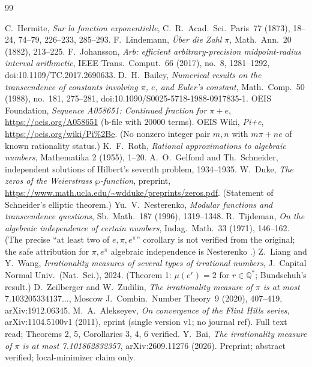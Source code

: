 \documentclass[11pt]{amsart}
\theoremstyle{definition}
\theoremstyle{remark}
\numberwithin{equation}{section}
\newcommand{\Q}{\mathbb{Q}}
\newcommand{\irr}{\mu}
\newcommand{\ee}{e}
\begin{document}
\begin{thebibliography}{99}

 C.~Hermite, \emph{Sur la fonction exponentielle}, C.~R.~Acad.~Sci.~Paris~77 (1873), 18--24, 74--79, 226--233, 285--293.
 F.~Lindemann, \emph{\"Uber die Zahl $\pi$}, Math.~Ann.~20 (1882), 213--225.
 F.~Johansson, \emph{Arb: efficient arbitrary-precision midpoint-radius interval arithmetic}, IEEE Trans.~Comput.~66 (2017), no.~8, 1281--1292, doi:10.1109/TC.2017.2690633.
 D.~H.~Bailey, \emph{Numerical results on the transcendence of constants involving $\pi$, $e$, and Euler's constant}, Math.~Comp.~50 (1988), no.~181, 275--281, doi:10.1090/S0025-5718-1988-0917835-1.
 OEIS Foundation, \emph{Sequence A058651: Continued fraction for $\pi+e$}, \url{https://oeis.org/A058651} (b-file with $20000$ terms).
 OEIS Wiki, \emph{Pi+e}, \url{https://oeis.org/wiki/Pi\%2Be}. (No nonzero integer pair $m,n$ with $m\pi+n\ee$ of known rationality status.)
 K.~F.~Roth, \emph{Rational approximations to algebraic numbers}, Mathematika 2 (1955), 1--20.
 A.~O.~Gelfond and Th.~Schneider, independent solutions of Hilbert's seventh problem, 1934--1935.
 W.~Duke, \emph{The zeros of the Weierstrass $\wp$-function}, preprint, \url{https://www.math.ucla.edu/~wdduke/preprints/zeros.pdf}. (Statement of Schneider's elliptic theorem.)
 Yu.~V.~Nesterenko, \emph{Modular functions and transcendence questions}, Sb.~Math.~187 (1996), 1319--1348.
 R.~Tijdeman, \emph{On the algebraic independence of certain numbers}, Indag.~Math.~33 (1971), 146--162. (The precise ``at least two of $\ee,\pi,\ee^\pi$'' corollary is not verified from the original; the safe attribution for $\pi,\ee^\pi$ algebraic independence is Nesterenko \cite{Nesterenko1996}.)
 Z.~Liang and Y.~Wang, \emph{Irrationality measures of several types of irrational numbers}, J.~Capital Normal Univ.~(Nat.~Sci.), 2024. (Theorem 1: $\irr(\ee^r)=2$ for $r\in\Q^*$; Bundschuh's result.)
 D.~Zeilberger and W.~Zudilin, \emph{The irrationality measure of $\pi$ is at most $7.103205334137\dots$}, Moscow J.~Combin.~Number Theory~9 (2020), 407--419, arXiv:1912.06345.
 M.~A.~Alekseyev, \emph{On convergence of the Flint Hills series}, arXiv:1104.5100v1 (2011), eprint (single version v1; no journal ref). Full text read; Theorems 2, 5, Corollaries 3, 4, 6 verified.
 Y.~Bai, \emph{The irrationality measure of $\pi$ is at most 7.101862832357}, arXiv:2609.11276 (2026). Preprint; abstract verified; local-minimizer claim only.

\end{thebibliography}
\end{document}
